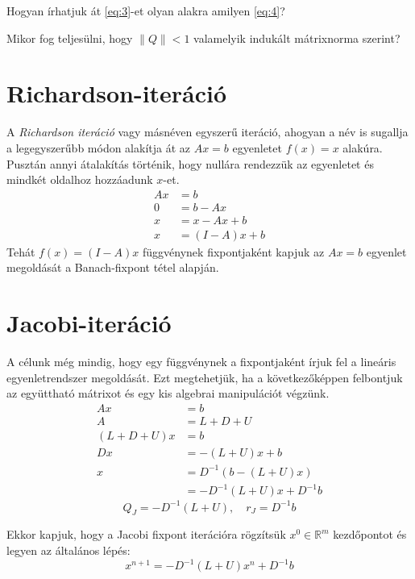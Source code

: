 \begin{kerdes}
    Hogyan írhatjuk át \ref{eq:3}-et olyan alakra amilyen \ref{eq:4}?
\end{kerdes}
\begin{kerdes}
    Mikor fog teljesülni, hogy $\| Q \| < 1$ valamelyik indukált mátrixnorma szerint?
\end{kerdes}

\section{Richardson-iteráció}
A \textit{Richardson iteráció} vagy másnéven egyszerű iteráció, ahogyan a név is sugallja a legegyszerűbb módon alakítja át az $Ax = b$ egyenletet $f(x) = x$ alakúra. Pusztán annyi átalakítás történik, hogy nullára rendezzük az egyenletet és mindkét oldalhoz hozzáadunk $x$-et.
\begin{align*}
    Ax & = b \\
    0 & = b - Ax \\
    x & = x - Ax + b \\
    x & = (I - A)x + b
\end{align*}
Tehát $f(x) = (I - A)x$ függvénynek fixpontjaként kapjuk az $Ax = b$ egyenlet megoldását a Banach-fixpont tétel alapján.

\section{Jacobi-iteráció}
A célunk még mindig, hogy egy függvénynek a fixpontjaként írjuk fel a lineáris egyenletrendszer megoldását. Ezt megtehetjük, ha a következőképpen felbontjuk az együttható mátrixot és egy kis algebrai manipulációt végzünk.
\begin{align*}
    Ax & = b \\
    A & = L + D + U \\
    (L + D + U)x & = b \\
    Dx & = -(L+U)x + b \\
    x & = D^{-1}(b - (L+U)x) \\
    & = -D^{-1}(L+U)x + D^{-1}b
\end{align*}
\begin{equation*}
    Q_{J} = -D^{-1}(L+U), \quad r_{J} = D^{-1}b
\end{equation*}

Ekkor kapjuk, hogy a Jacobi fixpont iterációra rögzítsük $x^{0} \in \mathbb{R}^{m}$ kezdőpontot és legyen az általános lépés:
\begin{equation*}
    x^{n+1} = -D^{-1}(L+U)x^{n} + D^{-1}b
\end{equation*}

